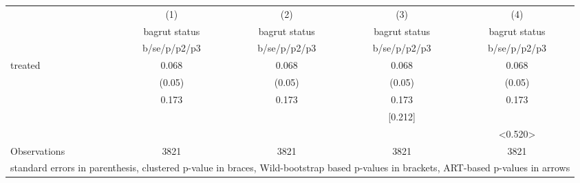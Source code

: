 {
\def\sym#1{\ifmmode^{#1}\else\(^{#1}\)\fi}
\begin{tabular}{l*{4}{c}}
\hline\hline
                    &\multicolumn{1}{c}{(1)}&\multicolumn{1}{c}{(2)}&\multicolumn{1}{c}{(3)}&\multicolumn{1}{c}{(4)}\\
                    &\multicolumn{1}{c}{bagrut status}&\multicolumn{1}{c}{bagrut status}&\multicolumn{1}{c}{bagrut status}&\multicolumn{1}{c}{bagrut status}\\
                    &b/se/p/p2/p3         &b/se/p/p2/p3         &b/se/p/p2/p3         &b/se/p/p2/p3         \\
\hline
treated             &       0.068         &       0.068         &       0.068         &       0.068         \\
                    &      (0.05)         &      (0.05)         &      (0.05)         &      (0.05)         \\
                    &     {0.173}         &     {0.173}         &     {0.173}         &     {0.173}         \\
                    &                     &                     &     [0.212]         &                     \\
                    &                     &                     &                     &     <0.520>         \\
\hline
Observations        &        3821         &        3821         &        3821         &        3821         \\
\hline\hline
\multicolumn{5}{l}{\footnotesize standard errors in parenthesis, clustered p-value in braces, Wild-bootstrap based p-values in brackets, ART-based p-values in arrows}\\
\end{tabular}
}
